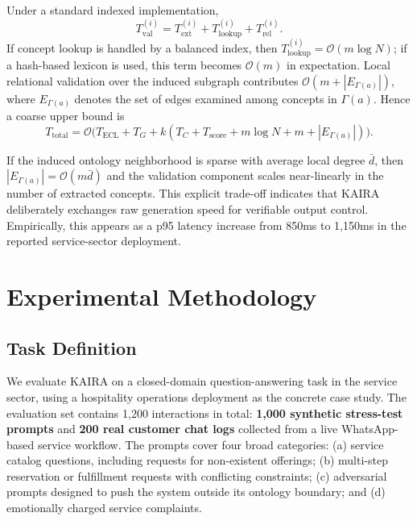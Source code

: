 \documentclass[11pt,a4paper]{article}
\begin{document}
Under a standard indexed implementation,
\[
T_{\mathrm{val}}^{(i)} = T_{\mathrm{ext}}^{(i)} + T_{\mathrm{lookup}}^{(i)} + T_{\mathrm{rel}}^{(i)}.
\]
If concept lookup is handled by a balanced index, then $T_{\mathrm{lookup}}^{(i)} = \mathcal{O}(m\log N)$; if a hash-based lexicon is used, this term becomes $\mathcal{O}(m)$ in expectation. Local relational validation over the induced subgraph contributes $\mathcal{O}(m + |E_{\Gamma(a)}|)$, where $E_{\Gamma(a)}$ denotes the set of edges examined among concepts in $\Gamma(a)$. Hence a coarse upper bound is
\begin{equation}
  T_{\text{total}} = \mathcal{O}\!\bigl(T_{\text{ECL}} + T_G + k(T_C + T_{\mathrm{score}} + m\log N + m + |E_{\Gamma(a)}|)\bigr).
  \label{eq:complexity_bound}
\end{equation}

If the induced ontology neighborhood is sparse with average local degree $\bar d$, then $|E_{\Gamma(a)}|=\mathcal{O}(m\bar d)$ and the validation component scales near-linearly in the number of extracted concepts. This explicit trade-off indicates that KAIRA deliberately exchanges raw generation speed for verifiable output control. Empirically, this appears as a p95 latency increase from 850ms to 1,150ms in the reported service-sector deployment.

\section{Experimental Methodology}

\subsection{Task Definition}
We evaluate KAIRA on a closed-domain question-answering task in the service sector, using a hospitality operations deployment as the concrete case study. The evaluation set contains 1,200 interactions in total: \textbf{1,000 synthetic stress-test prompts} and \textbf{200 real customer chat logs} collected from a live WhatsApp-based service workflow. The prompts cover four broad categories: (a) service catalog questions, including requests for non-existent offerings; (b) multi-step reservation or fulfillment requests with conflicting constraints; (c) adversarial prompts designed to push the system outside its ontology boundary; and (d) emotionally charged service complaints.
\end{document}
